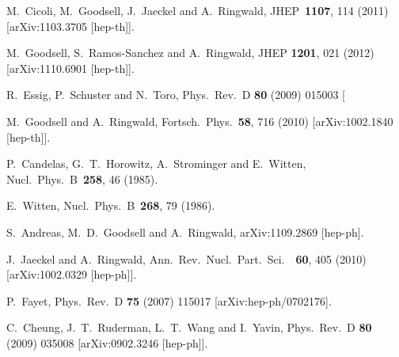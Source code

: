  
  M.~Cicoli, M.~Goodsell, J.~Jaeckel and A.~Ringwald,
  JHEP\ {\bf 1107}, 114  (2011)
  [arXiv:1103.3705 [hep-th]].

 M.~Goodsell, S.~Ramos-Sanchez and A.~Ringwald,
 JHEP {\bf 1201}, 021 (2012)
 [arXiv:1110.6901 [hep-th]].

R.~Essig, P.~Schuster and N.~Toro,
Phys.\ Rev.\ D {\bf 80} (2009) 015003
[%

  M.~Goodsell and A.~Ringwald,
  Fortsch.\ Phys.\  {\bf 58}, 716 (2010)
  [arXiv:1002.1840 [hep-th]].
 
  P.~Candelas, G.~T.~Horowitz, A.~Strominger and E.~Witten,
  Nucl.\ Phys.\ B\ {\bf 258}, 46  (1985).

  E.~Witten,
  Nucl.\ Phys.\ B\ {\bf 268}, 79  (1986).

 S.~Andreas, M.~D.~Goodsell and A.~Ringwald,
 arXiv:1109.2869 [hep-ph].

  J.~Jaeckel and A.~Ringwald,
  Ann.\ Rev.\ Nucl.\ Part.\ Sci.\ \ {\bf 60}, 405  (2010)
  [arXiv:1002.0329 [hep-ph]].

P.~Fayet,
Phys.\ Rev.\ D {\bf 75} (2007) 115017
[arXiv:hep-ph/0702176].

C.~Cheung, J.~T.~Ruderman, L.~T.~Wang and I.~Yavin,
Phys.\ Rev.\ D {\bf 80} (2009) 035008
[arXiv:0902.3246 [hep-ph]].

